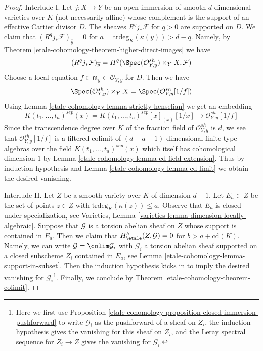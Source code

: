 \begin{proof}
\medskip\noindent
Interlude I. Let $j : X \to Y$ be an open immersion of smooth
$d$-dimensional varieties over $K$ (not necessarily affine)
whose complement is the support of an effective Cartier divisor $D$.
The sheaves $R^qj_*\mathcal{F}$ for $q > 0$ are supported on $D$.
We claim that $(R^qj_*\mathcal{F})_{\overline{y}} = 0$
for $a = \text{trdeg}_K(\kappa(y)) > d - q$. Namely, by
Theorem \ref{etale-cohomology-theorem-higher-direct-images} we have
$$
(R^qj_*\mathcal{F})_{\overline{y}} =
H^q(\Spec(\mathcal{O}_{Y, y}^{sh}) \times_Y X, \mathcal{F})
$$
Choose a local equation $f \in \mathfrak m_y \subset \mathcal{O}_{Y, y}$
for $D$. Then we have
$$
\Spec(\mathcal{O}_{Y, y}^{sh}) \times_Y X =
\Spec(\mathcal{O}_{Y, y}^{sh}[1/f])
$$
Using Lemma \ref{etale-cohomology-lemma-strictly-henselian} we get an embedding
$$
K(t_1, \ldots, t_a)^{sep}(x) =
K(t_1, \ldots, t_a)^{sep}[x]_{(x)}[1/x]
\longrightarrow
\mathcal{O}_{Y, y}^{sh}[1/f]
$$
Since the transcendence degree over $K$ of the fraction field of
$\mathcal{O}_{Y, y}^{sh}$ is $d$, we see that $\mathcal{O}_{Y, y}^{sh}[1/f]$
is a filtered colimit of $(d - a - 1)$-dimensional finite type algebras over
the field $K(t_1, \ldots, t_a)^{sep}(x)$ which itself has cohomological
dimension $1$ by Lemma \ref{etale-cohomology-lemma-cd-field-extension}. Thus by induction
hypothesis and Lemma \ref{etale-cohomology-lemma-cd-limit}
we obtain the desired vanishing.

\medskip\noindent
Interlude II. Let $Z$ be a smooth variety over $K$ of dimension $d - 1$.
Let $E_a \subset Z$ be the set of points $z \in Z$ with
$\text{trdeg}_K(\kappa(z)) \leq a$. Observe that $E_a$ is closed
under specialization, see
Varieties, Lemma \ref{varieties-lemma-dimension-locally-algebraic}.
Suppose that $\mathcal{G}$ is a torsion abelian sheaf on $Z$
whose support is contained in $E_a$. Then we claim that
$H^b_\etale(Z, \mathcal{G}) = 0$ for $b > a + \text{cd}(K)$.
Namely, we can write $\mathcal{G} = \colim \mathcal{G}_i$
with $\mathcal{G}_i$ a torsion abelian sheaf
supported on a closed subscheme $Z_i$ contained in $E_a$, see
Lemma \ref{etale-cohomology-lemma-support-in-subset}.
Then the induction hypothesis kicks in to imply
the desired vanishing for $\mathcal{G}_i$\footnote{Here
we first use Proposition \ref{etale-cohomology-proposition-closed-immersion-pushforward}
to write $\mathcal{G}_i$ as the pushforward of a sheaf on $Z_i$,
the induction hypothesis gives the vanishing for this sheaf on $Z_i$, and
the Leray spectral sequence for $Z_i \to Z$ gives the vanishing
for $\mathcal{G}_i$.}. Finally, we
conclude by Theorem \ref{etale-cohomology-theorem-colimit}.


\end{proof}
